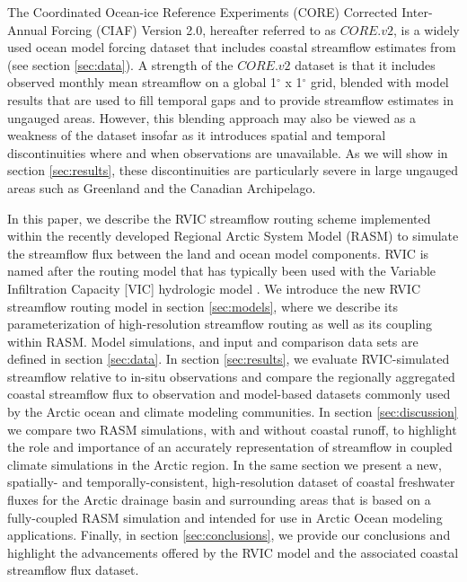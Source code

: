\documentclass[jgrga, draft]{agutex}
\begin{document}
\begin{article}
The Coordinated Ocean-ice Reference Experiments (CORE) Corrected Inter-Annual Forcing (CIAF) Version 2.0, hereafter referred to as $CORE.v2$, is a widely used ocean model forcing dataset that includes coastal streamflow estimates from \citet{Dai_2009} (see section \ref{sec:data}).
A strength of the $CORE.v2$ dataset is that it includes observed monthly mean streamflow on a global 1$^{\circ}$ x 1$^{\circ}$ grid, blended with model results that are used to fill temporal gaps and to provide streamflow estimates in ungauged areas.
However, this blending approach may also be viewed as a weakness of the dataset insofar as it introduces spatial and temporal discontinuities where and when observations are unavailable.
As we will show in section \ref{sec:results}, these discontinuities are particularly severe in large ungauged areas such as Greenland and the Canadian Archipelago.

In this paper, we describe the RVIC streamflow routing scheme implemented within the recently developed Regional Arctic System Model (RASM) \citep{Roberts_2015a,DuVivier_2016,Hamman_2016} to simulate the streamflow flux between the land and ocean model components.
RVIC is named after the routing model that has typically been used with the Variable Infiltration Capacity [VIC] hydrologic model \citep{Liang_1996}.
We introduce the new RVIC streamflow routing model in section \ref{sec:models}, where we describe its parameterization of high-resolution streamflow routing as well as its coupling within RASM.
Model simulations, and input and comparison data sets are defined in section \ref{sec:data}.
In section \ref{sec:results}, we evaluate RVIC-simulated streamflow relative to in-situ observations and compare the regionally aggregated coastal streamflow flux to observation and model-based datasets commonly used by the Arctic ocean and climate modeling communities.
In section \ref{sec:discussion} we compare two RASM simulations, with and without coastal runoff, to highlight the role and importance of an accurately representation of streamflow in coupled climate simulations in the Arctic region.
In the same section we present a new, spatially- and temporally-consistent, high-resolution dataset of coastal freshwater fluxes for the Arctic drainage basin and surrounding areas that is based on a fully-coupled RASM simulation and intended for use in Arctic Ocean modeling applications.
Finally, in section \ref{sec:conclusions}, we provide our conclusions and highlight the advancements offered by the RVIC model and the associated coastal streamflow flux dataset.


\end{article}
\end{document}
